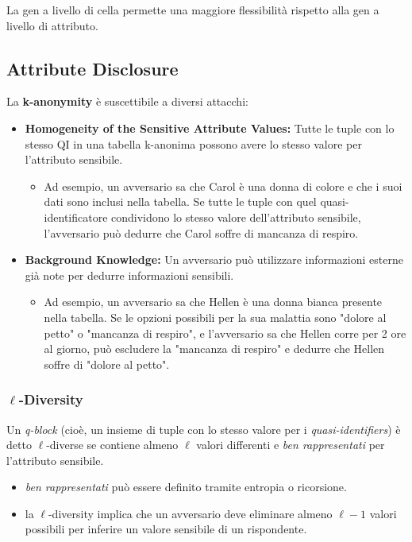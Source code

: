 \documentclass{report}
\begin{document}
\noindent La gen a livello di cella permette una maggiore flessibilità rispetto alla gen a livello di attributo.


\subsection{Attribute Disclosure}
La \textbf{k-anonymity} è suscettibile a diversi attacchi:

\begin{itemize}
    \item \textbf{Homogeneity of the Sensitive Attribute Values:} 
    Tutte le tuple con lo stesso QI in una tabella k-anonima possono avere lo stesso valore per l'attributo sensibile.
    \begin{itemize}
        \item Ad esempio, un avversario sa che Carol è una donna di colore e che i suoi dati sono inclusi nella tabella. Se tutte le tuple con quel quasi-identificatore condividono lo stesso valore dell'attributo sensibile, l'avversario può dedurre che Carol soffre di mancanza di respiro.
    \end{itemize}
    
    \item \textbf{Background Knowledge:} 
    Un avversario può utilizzare informazioni esterne già note per dedurre informazioni sensibili.
    \begin{itemize}
        \item Ad esempio, un avversario sa che Hellen è una donna bianca presente nella tabella. Se le opzioni possibili per la sua malattia sono "dolore al petto" o "mancanza di respiro", e l'avversario sa che Hellen corre per 2 ore al giorno, può escludere la "mancanza di respiro" e dedurre che Hellen soffre di "dolore al petto".
    \end{itemize}
\end{itemize}

\subsubsection{\texorpdfstring{$\ell$}{l}-Diversity}
Un \textit{q-block} (cioè, un insieme di tuple con lo stesso valore per i \textit{quasi-identifiers}) è detto $\ell$-diverse se contiene almeno $\ell$ valori differenti e \textit{ben rappresentati} per l'attributo sensibile. 
\begin{itemize}
    \item \textit{ben rappresentati} può essere definito tramite entropia o ricorsione. 
    \item la $\ell$-diversity implica che un avversario deve eliminare almeno $\ell-1$ valori possibili per inferire un valore sensibile di un rispondente.
\end{itemize}
\end{document}
